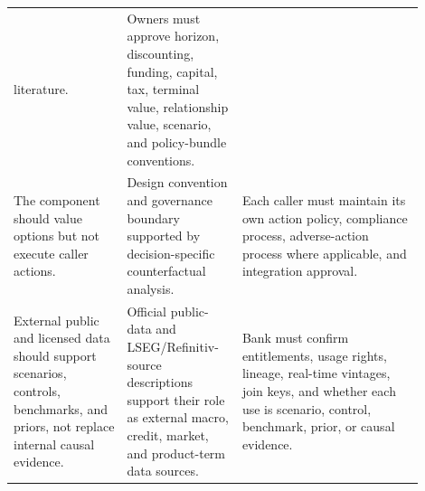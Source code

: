 \documentclass[11pt]{article}
\newcommand{\1}{\mathbf{1}}
\begin{document}
\begin{longtable}{p{0.25\linewidth}p{0.25\linewidth}p{0.40\linewidth}}
    literature.
  & Owners must approve horizon, discounting, funding, capital, tax, terminal
    value, relationship value, scenario, and policy-bundle conventions. \\
The component should value options but not execute caller actions.
  & Design convention and governance boundary supported by decision-specific
    counterfactual analysis.
  & Each caller must maintain its own action policy, compliance process,
    adverse-action process where applicable, and integration approval. \\
External public and licensed data should support scenarios, controls,
benchmarks, and priors, not replace internal causal evidence.
  & Official public-data and LSEG/Refinitiv-source descriptions support their
    role as external macro, credit, market, and product-term data sources.
  & Bank must confirm entitlements, usage rights, lineage, real-time vintages,
    join keys, and whether each use is scenario, control, benchmark, prior, or
    causal evidence. \\
\bottomrule
\end{longtable}
\end{document}
